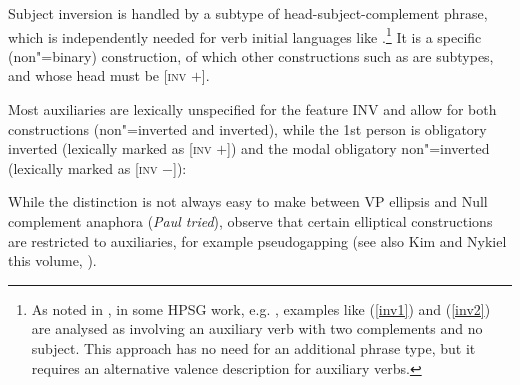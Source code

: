 \documentclass[output=paper
	        ,collection
	        ,collectionchapter
 	        ,biblatex
                ,babelshorthands
                ,newtxmath
                ,draftmode
                ,colorlinks, citecolor=brown
]{langscibook}
\begin{document}
Subject inversion is handled by a subtype of head-subject-complement phrase, which is independently needed for verb initial languages like  \parencites{Borsley99c-u}{SWB2003a}.\footnote{As noted in , in some HPSG work, e.g. , examples like (\ref{inv1}) and (\ref{inv2}) are analysed as involving an auxiliary verb with two complements and no subject. This approach has no need for an additional phrase type, but it requires an alternative valence description for auxiliary verbs.} It is a specific (non"=binary) construction, of which other constructions such as  are subtypes, and whose head must be [\textsc{inv} $+$].  
\begin{exe}
\ex {} \impl
{}
  \end{exe}          
       
Most auxiliaries are lexically unspecified for the feature INV and allow for both constructions (non"=inverted and inverted), while the 1st person  is obligatory inverted (lexically marked as [\textsc{inv} $+$]) and the modal  obligatory non"=inverted (lexically marked as [\textsc{inv} $-$]):

\eal
{}
\zl

While the distinction is not always easy to make between VP ellipsis and Null complement anaphora (\textit{Paul tried}), \citeauthor{Sagetal2020} observe that certain elliptical constructions are restricted to auxiliaries, for example pseudogapping (see also  Kim and Nykiel this volume, \citep{Miller2014a-u}).

\eal
{}
\zl
\end{document}

